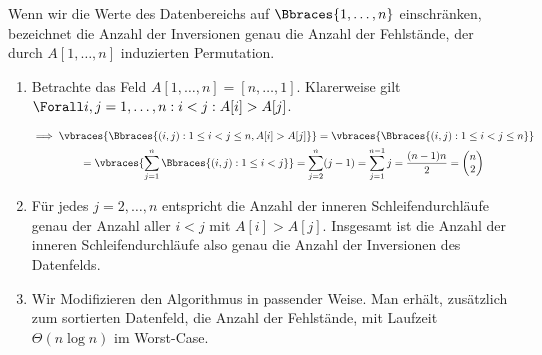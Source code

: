 \begin{solution}

Wenn wir die Werte des Datenbereichs auf $\Bbraces{1, \dots, n}$ einschränken, bezeichnet die Anzahl der Inversionen genau die Anzahl der Fehlstände, der durch $A[1, \dots, n]$ induzierten Permutation.

\begin{enumerate}[label = (\alph*)]

  \item Betrachte das Feld $A[1, \dots, n] = [n, \dots, 1]$.
  Klarerweise gilt $\Forall i, j = 1, \dots, n: i < j: A[i] > A[j]$.

  \begin{multline*}
    \implies
    \vbraces
    {
      \Bbraces
      {
        (i, j):
        1 \leq i < j \leq n,
        A[i] > A[j]
      }
    }
    =
    \vbraces
    {
      \Bbraces
      {
        (i, j):
        1 \leq i < j \leq n
      }
    } \\
    =
    \vbraces
    {
      \sum_{j=1}^n
      \Bbraces
      {
        (i, j):
        1 \leq i < j
      }
    }
    =
    \sum_{j=2}^n (j-1)
    =
    \sum_{j=1}^{n-1} j
    =
    \frac{(n - 1) n}{2}
    =
    \begin{pmatrix}
      n \\
      2
    \end{pmatrix}
  \end{multline*}

  \item Für jedes $j = 2, \dots, n$ entspricht die Anzahl der inneren Schleifendurchläufe genau der Anzahl aller $i < j$ mit $A[i] > A[j]$.
  Insgesamt ist die Anzahl der inneren Schleifendurchläufe also genau die Anzahl der Inversionen des Datenfelds.


  \item Wir Modifizieren den Algorithmus  in passender Weise.
  Man erhält, zusätzlich zum sortierten Datenfeld, die Anzahl der Fehlstände, mit Laufzeit $\Theta(n \log n)$ im Worst-Case.


\end{enumerate}
\end{solution}
